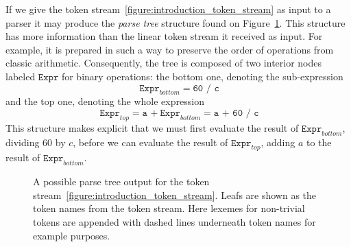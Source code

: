 \documentclass[
  oneside,
  english,
  coorientadorbanca,
  embeddedlogo,
  noabntexcite
]{ufsc-thesis-rn46-2019}
\newcommand{\bnfvar}[1]{\ \bnfvars{#1}}
\newcommand{\bnfvars}[1]{\texttt{#1}}
\newcommand{\bnfters}[1]{\textrm{`}\texttt{#1}\textrm{'}}
\begin{document}
If we give the token stream~\eqref{figure:introduction_token_stream} as input to a parser it may produce the \textit{parse tree} structure found on Figure~\ref{figure:introduction_ast}.
This structure has more information than the linear token stream it received as input.
For example, it is prepared in such a way to preserve the order of operations from classic arithmetic.
Consequently, the tree is composed of two interior nodes labeled $\bnfvars{Expr}$ for binary operations: the bottom one, denoting the sub-expression
\begin{equation*}
  \bnfvar{Expr}_{bottom} = \texttt{60 / c}
\end{equation*}
and the top one, denoting the whole expression
\begin{equation*}
  \bnfvar{Expr}_{top} = \texttt{a +} \bnfvar{Expr}_{bottom} = \texttt{a + 60 / c}
\end{equation*}
This structure makes explicit that we must first evaluate the result of $\bnfvars{Expr}_{bottom}$, dividing $60$ by $c$, before we can evaluate the result of $\bnfvars{Expr}_{top}$, adding $a$ to the result of $\bnfvars{Expr}_{bottom}$.

\begin{figure}[ht]
  \centering
  \caption{
    A possible parse tree output for the token stream~\eqref{figure:introduction_token_stream}.
    Leafs are shown as the token names from the token stream.
    Here lexemes for non-trivial tokens are appended with dashed lines underneath token names for example purposes.
  }\label{figure:introduction_ast}
\end{figure}
\end{document}
